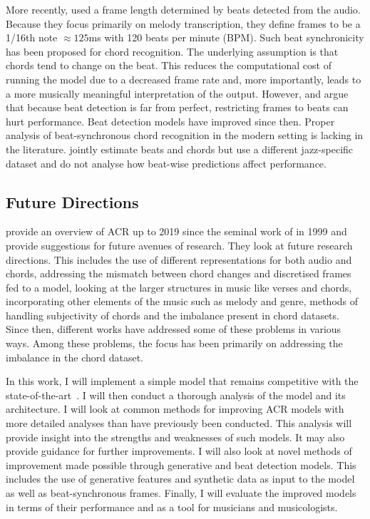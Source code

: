 More recently, \citet{MelodyTranscriptionViaGenerativePreTraining} used a frame length determined by beats detected from the audio. Because they focus primarily on melody transcription, they define frames to be a 1/16th note $\approx 125$ms with 120 beats per minute (BPM). Such beat synchronicity has been proposed for chord recognition. The underlying assumption is that chords tend to change on the beat. This reduces the computational cost of running the model due to a decreased frame rate and, more importantly, leads to a more musically meaningful interpretation of the output. However, \citet{CommonVariations} and \citet{RelativePerformance} argue that because beat detection is far from perfect, restricting frames to beats can hurt performance. Beat detection models have improved since then. Proper analysis of beat-synchronous chord recognition in the modern setting is lacking in the literature.  \citet{ChorusAlignmentJAAH} jointly estimate beats and chords but use a different jazz-specific dataset and do not analyse how beat-wise predictions affect performance.

\subsection{Future Directions}

\citet{20YearsofACR} provide an overview of ACR up to 2019 since the seminal work of \citet{FujishimaACR} in 1999 and provide suggestions for future avenues of research. They look at future research directions. This includes the use of different representations for both audio and chords, addressing the mismatch between chord changes and discretised frames fed to a model, looking at the larger structures in music like verses and chords, incorporating other elements of the music such as melody and genre, methods of handling subjectivity of chords and the imbalance present in chord datasets. Since then, different works have addressed some of these problems in various ways. Among these problems, the focus has been primarily on addressing the imbalance in the chord dataset. 

In this work, I will implement a simple model that remains competitive with the state-of-the-art~\citep{StructuredTraining}. I will then conduct a thorough analysis of the model and its architecture. I will look at common methods for improving ACR models with more detailed analyses than have previously been conducted. This analysis will provide insight into the strengths and weaknesses of such models. It may also provide guidance for further improvements. I will also look at novel methods of improvement made possible through generative and beat detection models. This includes the use of generative features and synthetic data as input to the model as well as beat-synchronous frames. Finally, I will evaluate the improved models in terms of their performance and as a tool for musicians and musicologists.

